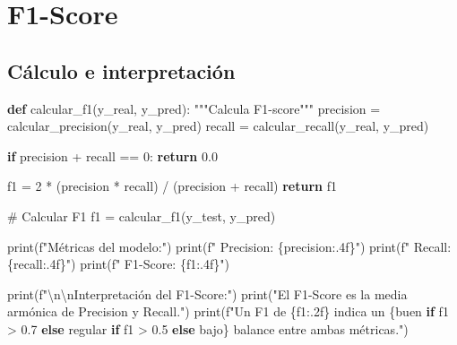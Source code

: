\documentclass[
  doc,
  floatsintext,
  longtable,
  a4paper,
  nolmodern,
  notxfonts,
  notimes,
  12pt,
  colorlinks=true,linkcolor=blue,citecolor=blue,urlcolor=blue]{apa7}
\newenvironment{Shaded}{\begin{snugshade}}{\end{snugshade}}
\newcommand{\BuiltInTok}[1]{\textcolor[rgb]{0.00,0.23,0.31}{#1}}
\newcommand{\CharTok}[1]{\textcolor[rgb]{0.13,0.47,0.30}{#1}}
\newcommand{\CommentTok}[1]{\textcolor[rgb]{0.37,0.37,0.37}{#1}}
\newcommand{\ControlFlowTok}[1]{\textcolor[rgb]{0.00,0.23,0.31}{\textbf{#1}}}
\newcommand{\DecValTok}[1]{\textcolor[rgb]{0.68,0.00,0.00}{#1}}
\newcommand{\FloatTok}[1]{\textcolor[rgb]{0.68,0.00,0.00}{#1}}
\newcommand{\KeywordTok}[1]{\textcolor[rgb]{0.00,0.23,0.31}{\textbf{#1}}}
\newcommand{\NormalTok}[1]{\textcolor[rgb]{0.00,0.23,0.31}{#1}}
\newcommand{\OperatorTok}[1]{\textcolor[rgb]{0.37,0.37,0.37}{#1}}
\newcommand{\SpecialCharTok}[1]{\textcolor[rgb]{0.37,0.37,0.37}{#1}}
\newcommand{\SpecialStringTok}[1]{\textcolor[rgb]{0.13,0.47,0.30}{#1}}
\newcommand{\StringTok}[1]{\textcolor[rgb]{0.13,0.47,0.30}{#1}}
\begin{document}
\section{F1-Score}\label{f1-score}

\subsection{Cálculo e
interpretación}\label{cuxe1lculo-e-interpretaciuxf3n-3}

\begin{Shaded}
\begin{Highlighting}[]
\KeywordTok{def}\NormalTok{ calcular\_f1(y\_real, y\_pred):}
    \CommentTok{"""Calcula F1{-}score"""}
\NormalTok{    precision }\OperatorTok{=}\NormalTok{ calcular\_precision(y\_real, y\_pred)}
\NormalTok{    recall }\OperatorTok{=}\NormalTok{ calcular\_recall(y\_real, y\_pred)}
    
    \ControlFlowTok{if}\NormalTok{ precision }\OperatorTok{+}\NormalTok{ recall }\OperatorTok{==} \DecValTok{0}\NormalTok{:}
        \ControlFlowTok{return} \FloatTok{0.0}
    
\NormalTok{    f1 }\OperatorTok{=} \DecValTok{2} \OperatorTok{*}\NormalTok{ (precision }\OperatorTok{*}\NormalTok{ recall) }\OperatorTok{/}\NormalTok{ (precision }\OperatorTok{+}\NormalTok{ recall)}
    \ControlFlowTok{return}\NormalTok{ f1}

\CommentTok{\# Calcular F1}
\NormalTok{f1 }\OperatorTok{=}\NormalTok{ calcular\_f1(y\_test, y\_pred)}

\BuiltInTok{print}\NormalTok{(}\SpecialStringTok{f"Métricas del modelo:"}\NormalTok{)}
\BuiltInTok{print}\NormalTok{(}\SpecialStringTok{f"  Precision: }\SpecialCharTok{\{}\NormalTok{precision}\SpecialCharTok{:.4f\}}\SpecialStringTok{"}\NormalTok{)}
\BuiltInTok{print}\NormalTok{(}\SpecialStringTok{f"  Recall: }\SpecialCharTok{\{}\NormalTok{recall}\SpecialCharTok{:.4f\}}\SpecialStringTok{"}\NormalTok{)}
\BuiltInTok{print}\NormalTok{(}\SpecialStringTok{f"  F1{-}Score: }\SpecialCharTok{\{}\NormalTok{f1}\SpecialCharTok{:.4f\}}\SpecialStringTok{"}\NormalTok{)}

\BuiltInTok{print}\NormalTok{(}\SpecialStringTok{f"}\CharTok{\textbackslash{}n\textbackslash{}n}\SpecialStringTok{Interpretación del F1{-}Score:"}\NormalTok{)}
\BuiltInTok{print}\NormalTok{(}\StringTok{"El F1{-}Score es la media armónica de Precision y Recall."}\NormalTok{)}
\BuiltInTok{print}\NormalTok{(}\SpecialStringTok{f"Un F1 de }\SpecialCharTok{\{}\NormalTok{f1}\SpecialCharTok{:.2f\}}\SpecialStringTok{ indica un }\SpecialCharTok{\{}\StringTok{\textquotesingle{}buen\textquotesingle{}} \ControlFlowTok{if}\NormalTok{ f1 }\OperatorTok{\textgreater{}} \FloatTok{0.7} \ControlFlowTok{else} \StringTok{\textquotesingle{}regular\textquotesingle{}} \ControlFlowTok{if}\NormalTok{ f1 }\OperatorTok{\textgreater{}} \FloatTok{0.5} \ControlFlowTok{else} \StringTok{\textquotesingle{}bajo\textquotesingle{}}\SpecialCharTok{\}}\SpecialStringTok{ balance entre ambas métricas."}\NormalTok{)}
\end{Highlighting}
\end{Shaded}
\end{document}

